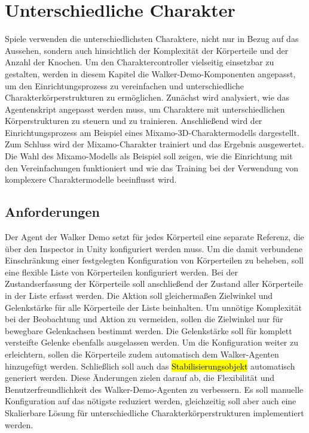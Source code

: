 \section{Unterschiedliche Charakter}
Spiele verwenden die unterschiedlichsten Charaktere, nicht nur in Bezug auf das Aussehen, sondern auch hinsichtlich der Komplexität der Körperteile und der Anzahl der Knochen. Um den Charaktercontroller vielseitig einsetzbar zu gestalten, werden in diesem Kapitel die Walker-Demo-Komponenten angepasst, um den Einrichtungsprozess zu vereinfachen und unterschiedliche Charakterkörperstrukturen zu ermöglichen. Zunächst wird analysiert, wie das Agentenskript angepasst werden muss, um Charaktere mit unterschiedlichen Körperstrukturen zu steuern und zu trainieren. Anschließend wird der Einrichtungsprozess am Beispiel eines Mixamo-3D-Charaktermodells dargestellt. Zum Schluss wird der Mixamo-Charakter trainiert und das Ergebnis ausgewertet. Die Wahl des Mixamo-Modells als Beispiel soll zeigen, wie die Einrichtung mit den Vereinfachungen funktioniert und wie das Training bei der Verwendung von komplexere Charaktermodelle beeinflusst wird.

\subsection{Anforderungen}	
Der Agent der Walker Demo setzt für jedes Körperteil eine separate Referenz, die über den Inspector in Unity konfiguriert werden muss. Um die damit verbundene Einschränkung einer festgelegten Konfiguration von Körperteilen zu beheben, soll eine flexible Liste von Körperteilen konfiguriert werden. Bei der Zustandserfassung der Körperteile soll anschließend der Zustand aller Körperteile in der Liste erfasst werden. Die Aktion soll gleichermaßen Zielwinkel und Gelenkstärke für alle Körperteile der Liste beinhalten. Um unnötige Komplexität bei der Beobachtung und Aktion zu vermeiden, sollen die Zielwinkel nur für bewegbare Gelenkachsen bestimmt werden. Die Gelenkstärke soll für komplett versteifte Gelenke ebenfalls ausgelassen werden. Um die Konfiguration weiter zu erleichtern, sollen die Körperteile zudem automatisch dem Walker-Agenten hinzugefügt werden. Schließlich soll auch das \hl{Stabilisierungsobjekt} automatisch generiert werden. Diese Änderungen zielen darauf ab, die Flexibilität und Benutzerfreundlichkeit des Walker-Demo-Agenten zu verbessern. Es soll manuelle Konfiguration auf das nötigste reduziert werden, gleichzeitig soll aber auch eine Skalierbare Lösung für unterschiedliche Charakterkörperstrukturen implementiert werden.

